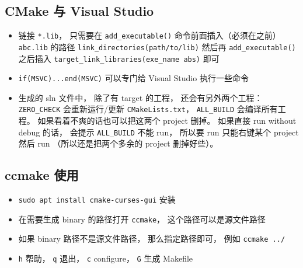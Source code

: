 \subsection{CMake 与 Visual Studio}
\begin{itemize}
\item 链接 \verb`*.lib`， 只需要在 \verb`add_executable()` 命令前面插入（必须在之前） \verb`abc.lib` 的路径 \verb`link_directories(path/to/lib)` 然后再 \verb`add_executable()` 之后插入 \verb`target_link_libraries(exe_name abs)` 即可
\item \verb`if(MSVC)...end(MSVC)` 可以专门给 Visual Studio 执行一些命令
\item 生成的 sln 文件中， 除了有 target 的工程， 还会有另外两个工程： \verb`ZERO_CHECK` 会重新运行/更新 \verb`CMakeLists.txt`， \verb`ALL_BUILD` 会编译所有工程。 如果看着不爽的话也可以把这两个 project 删掉。 如果直接 run without debug 的话， 会提示 \verb`ALL_BUILD` 不能 run， 所以要 run 只能右键某个 project 然后 run （所以还是把两个多余的 project 删掉好些）。
\end{itemize}

\subsection{ccmake 使用}
\begin{itemize}
\item \verb`sudo apt install cmake-curses-gui` 安装
\item 在需要生成 binary 的路径打开 \verb`ccmake`， 这个路径可以是源文件路径
\item 如果 binary 路径不是源文件路径， 那么指定路径即可， 例如 \verb`ccmake ../`
\item \verb`h` 帮助， \verb`q` 退出， \verb`c` configure， \verb`G` 生成 Makefile
\end{itemize}
